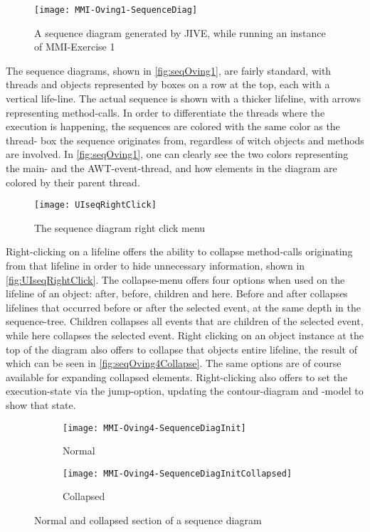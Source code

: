 \begin{figure}[H]
	\centering
	\texttt{[image: MMI-Oving1-SequenceDiag]}
	\caption{A sequence diagram generated by JIVE, while running an instance of MMI-Exercise 1}
	\label{fig:seqOving1}
\end{figure}
The sequence diagrams, shown in \autoref{fig:seqOving1}, are fairly standard, with threads and objects represented by boxes on a row at the top, each with a vertical life-line.
The actual sequence is shown with a thicker lifeline, with arrows representing method-calls.
In order to differentiate the threads where the execution is happening, the sequences are colored with the same color as the thread- box the sequence originates from, regardless of witch objects and methods are involved.
In \autoref{fig:seqOving1}, one can clearly see the two colors representing the main- and the AWT-event-thread, and how elements in the diagram are colored by their parent thread.
\begin{figure}[H]
	\centering
	\texttt{[image: UIseqRightClick]}
	\caption{The sequence diagram right click menu}
	\label{fig:UIseqRightClick}
\end{figure}
Right-clicking on a lifeline offers the ability to collapse method-calls originating from that lifeline in order to hide unnecessary information, shown in \autoref{fig:UIseqRightClick}.
The collapse-menu offers four options when used on the lifeline of an object: after, before, children and here.
Before and after collapses lifelines that occurred before or after the selected event, at the same depth in the sequence-tree.
Children collapses all events that are children of the selected event, while here collapses the selected event.%
Right clicking on an object instance at the top of the diagram also offers to collapse that objects entire lifeline, the result of which can be seen in \autoref{fig:seqOving4Collapse}.
The same options are of course available for expanding collapsed elements.
Right-clicking also offers to set the execution-state via the jump-option, updating the contour-diagram and -model to show that state.
~\\

\begin{figure}[H]
	\centering
	\begin{subfigure}{\textwidth}
		\centering
		\texttt{[image: MMI-Oving4-SequenceDiagInit]}
		\caption{Normal}
		\label{fig:seqOving4CollapseA}
	\end{subfigure}
	\begin{subfigure}{\textwidth}
		\centering
		\texttt{[image: MMI-Oving4-SequenceDiagInitCollapsed]}
		\caption{Collapsed}
		\label{fig:seqOving4CollapseB}
	\end{subfigure}
	\caption{Normal and collapsed section of a sequence diagram}
	\label{fig:seqOving4Collapse} 
\end{figure}

